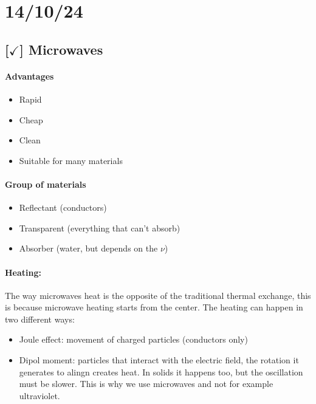 \section{14/10/24}

\subsection{[$\checkmark$] Microwaves}

\paragraph{Advantages}
\begin{itemize}
    \item Rapid
    \item Cheap
    \item Clean
    \item Suitable for many materials
\end{itemize}

\paragraph{Group of materials}

\begin{itemize}
    \item Reflectant (conductors)
    \item Transparent (everything that can't absorb)
    \item Absorber (water, but depends on the $\nu$)
\end{itemize}

\paragraph{Heating:} The way microwaves heat is the opposite of the traditional thermal exchange, this is because microwave heating starts from the center. The heating can happen in two different ways:

\begin{itemize}
    \item Joule effect: movement of charged particles (conductors only)
    \item Dipol moment: particles that interact with the electric field, the rotation it generates to alingn creates heat. In solids it happens too, but the oscillation must be slower. This is why we use microwaves and not for example ultraviolet. 
\end{itemize}

